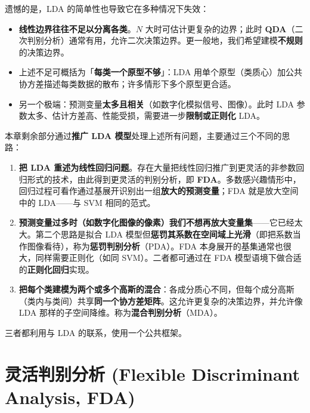 \begin{remark}
遗憾的是，LDA 的简单性也导致它在多种情况下失效：

\begin{itemize}
\item \textbf{线性边界往往不足以分离各类}。$N$ 大时可估计更复杂的边界；此时 \textbf{QDA}（二次判别分析）通常有用，允许二次决策边界。更一般地，我们希望建模\textbf{不规则}的决策边界。
\item 上述不足可概括为「\textbf{每类一个原型不够}」：LDA 用单个原型（类质心）加公共协方差描述每类数据的散布；许多情形下多个原型更合适。
\item 另一个极端：预测变量\textbf{太多且相关}（如数字化模拟信号、图像）。此时 LDA 参数太多、估计方差高、性能受损，需要进一步\textbf{限制或正则化} LDA。
\end{itemize}
\end{remark}

本章剩余部分通过\textbf{推广 LDA 模型}处理上述所有问题，主要通过三个不同的思路：

\begin{enumerate}
\item \textbf{把 LDA 重述为线性回归问题}。存在大量把线性回归推广到更灵活的非参数回归形式的技术，由此得到更灵活的判别分析，即 \textbf{FDA}。多数感兴趣情形中，回归过程可看作通过基展开识别出一组\textbf{放大的预测变量}；FDA 就是放大空间中的 LDA——与 SVM 相同的范式。

\item \textbf{预测变量过多时（如数字化图像的像素）我们不想再放大变量集}——它已经太大。第二个思路是拟合 LDA 模型但\textbf{惩罚其系数在空间域上光滑}（即把系数当作图像看待），称为\textbf{惩罚判别分析}（PDA）。FDA 本身展开的基集通常也很大，同样需要正则化（如同 SVM）。二者都可通过在 FDA 模型语境下做合适的\textbf{正则化回归}实现。

\item \textbf{把每个类建模为两个或多个高斯的混合}：各成分质心不同，但每个成分高斯（类内与类间）共享\textbf{同一个协方差矩阵}。这允许更复杂的决策边界，并允许像 LDA 那样的子空间降维。称为\textbf{混合判别分析}（MDA）。
\end{enumerate}

三者都利用与 LDA 的联系，使用一个公共框架。

\section{灵活判别分析 (Flexible Discriminant Analysis, FDA)}

